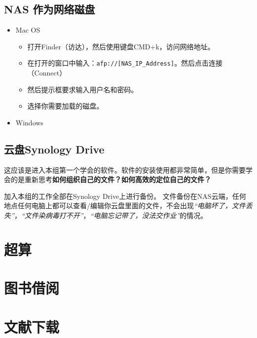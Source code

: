 \documentclass[
]{book}
\providecommand{\tightlist}{%
  \setlength{\itemsep}{0pt}\setlength{\parskip}{0pt}}
\begin{document}
\hypertarget{nas-ux4f5cux4e3aux7f51ux7edcux78c1ux76d8}{%
\subsection{NAS 作为网络磁盘}\label{nas-ux4f5cux4e3aux7f51ux7edcux78c1ux76d8}}

\begin{itemize}
\tightlist
\item
  Mac OS

  \begin{itemize}
  \tightlist
  \item
    打开Finder（访达），然后使用键盘CMD+k，访问网络地址。
  \item
    在打开的窗口中输入：\texttt{afp://{[}NAS\_IP\_Address{]}}。然后点击连接（Connect）
  \item
    然后提示框要求输入用户名和密码。
  \item
    选择你需要加载的磁盘。
  \end{itemize}
\item
  Windows
\end{itemize}

\hypertarget{synology}{%
\subsection{云盘Synology Drive}\label{synology}}

这应该是进入本组第一个学会的软件。软件的安装使用都非常简单，但是你需要学会的是重新思考\textbf{如何组织自己的文件？如何高效的定位自己的文件？}

加入本组的工作全部在Synology Drive上进行备份。 文件备份在NAS云端，任何地点任何电脑上都可以查看/编辑你云盘里面的文件，不会出现\emph{``电脑坏了，文件丢失''}，\emph{``文件染病毒打不开''}，\emph{``电脑忘记带了，没法交作业''}的情况。

\hypertarget{ux8d85ux7b97}{%
\section{超算}\label{ux8d85ux7b97}}

\hypertarget{ux56feux4e66ux501fux9605}{%
\section{图书借阅}\label{ux56feux4e66ux501fux9605}}

\hypertarget{ux6587ux732eux4e0bux8f7d}{%
\section{文献下载}\label{ux6587ux732eux4e0bux8f7d}}
\end{document}
